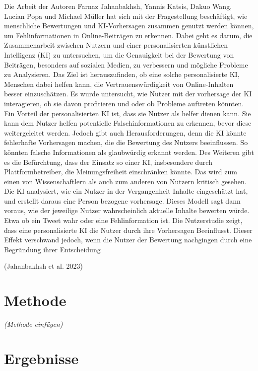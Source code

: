 \documentclass[
  12pt,
  a4paper,
]{article}
\begin{document}
Die Arbeit der Autoren Farnaz Jahanbakhsh, Yannis Katsis, Dakuo Wang,
Lucian Popa und Michael Müller hat sich mit der Fragestellung
beschäftigt, wie menschliche Bewertungen und KI-Vorhersagen zusammen
genutzt werden können, um Fehlinformationen in Online-Beiträgen zu
erkennen. Dabei geht es darum, die Zusammenarbeit zwischen Nutzern und
einer personalisierten künstlichen Intelligenz (KI) zu untersuchen, um
die Genauigkeit bei der Bewertung von Beiträgen, besonders auf sozialen
Medien, zu verbessern und mögliche Probleme zu Analysieren. Das Ziel ist
herauszufinden, ob eine solche personalisierte KI, Menschen dabei helfen
kann, die Vertrauenswürdigkeit von Online-Inhalten besser einzuschätzen.
Es wurde untersucht, wie Nutzer mit der vorhersage der KI interagieren,
ob sie davon profitieren und oder ob Probleme auftreten könnten. Ein
Vorteil der personalisierten KI ist, dass sie Nutzer als helfer dienen
kann. Sie kann dem Nutzer helfen potentielle Falschinformationen zu
erkennen, bevor diese weitergeleitet werden. Jedoch gibt auch
Herausforderungen, denn die KI könnte fehlerhafte Vorhersagen machen,
die die Bewertung des Nutzers beeinflussen. So könnten falsche
Informationen als glaubwürdig erkannt werden. Des Weiteren gibt es die
Befürchtung, dass der Einsatz so einer KI, insbesondere durch
Plattformbetreiber, die Meinungsfreiheit einschränken könnte. Das wird
zum einen von Wissenschaftlern als auch zum anderen von Nutzern kritisch
gesehen. Die KI analysiert, wie ein Nutzer in der Vergangenheit Inhalte
eingeschätzt hat, und erstellt daraus eine Person bezogene vorhersage.
Dieses Modell sagt dann voraus, wie der jeweilige Nutzer wahrscheinlich
aktuelle Inhalte bewerten würde. Etwa ob ein Tweet wahr oder eine
Fehlinformation ist. Die Nutzerstudie zeigt, dass eine personalisierte
KI die Nutzer durch ihre Vorhersagen Beeinflusst. Dieser Effekt
verschwand jedoch, wenn die Nutzer der Bewertung nachgingen durch eine
Begründung ihrer Entscheidung

(Jahanbakhsh et al. 2023)

\section{Methode}\label{methode}

\emph{(Methode einfügen)}

\section{Ergebnisse}\label{ergebnisse}
\end{document}
